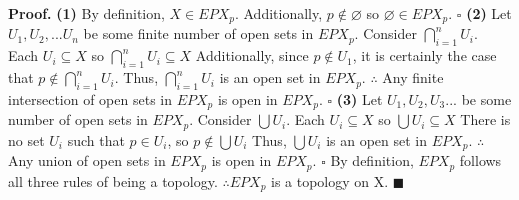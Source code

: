 \documentclass[12pt]{article}
\begin{document}
	\textbf{Proof. } \newline
	\textbf{(1)} By definition, \(X \in EPX_p\). \newline
	Additionally, \(p \notin \varnothing\) so \(\varnothing \in EPX_p\).
	\newline \(\square\) \newline \newline
	\textbf{(2)} Let \(U_1, U_2,...U_n\) be some finite number of open sets in \(EPX_p\). \newline
	Consider \(\bigcap_{i=1}^n U_i\). \newline \newline
	Each \(U_i \subseteq X\) so \(\bigcap_{i=1}^n U_i \subseteq X\) \newline
	Additionally, since \(p \notin U_1\), it is certainly the case that \(p \notin \bigcap_{i=1}^n U_i\). \newline
	Thus, \(\bigcap_{i=1}^n U_i\) is an open set in \(EPX_p\). \newline
	\(\therefore \) Any finite intersection of open sets in \(EPX_p\) is open in \(EPX_p\).
	\newline \(\square\) \newline \newline
	\textbf{(3)} Let \(U_1, U_2,U_3...\) be some number of open sets in \(EPX_p\). \newline
	Consider \(\bigcup U_i\). \newline \newline
	Each \(U_i \subseteq X\) so \(\bigcup U_i \subseteq X\) \newline
	There is no set \(U_i\) such that  \(p \in U_i\), so \(p \notin \bigcup U_i\)\newline
	Thus, \(\bigcup U_i\) is an open set in \(EPX_p\). \newline
	\(\therefore \) Any union of open sets in \(EPX_p\) is open in \(EPX_p\).
	\newline \(\square\) \newline
	By definition, \(EPX_p\) follows all three rules of being a topology.
	\newline \(\therefore EPX_p\) is a topology on X.
	\newline \(\blacksquare\) \newpage
\end{document}
